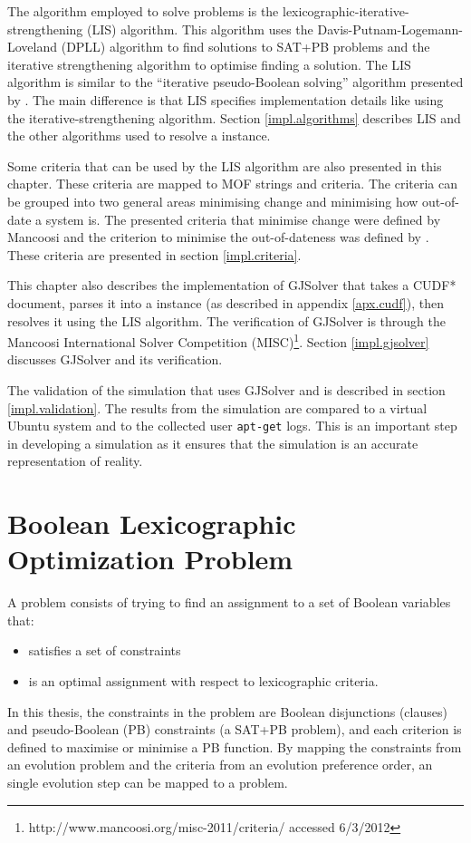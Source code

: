The algorithm employed to solve \modelimpl problems is the lexicographic-iterative-strengthening (LIS) algorithm.
This algorithm uses the Davis-Putnam-Logemann-Loveland (DPLL) \citep{Davis1960, davis1962machine} algorithm to find solutions to SAT+PB problems
and the iterative strengthening \citep{calistri1994iterative, le2010sat4j} algorithm to optimise finding a solution.
The LIS algorithm is similar to the ``iterative pseudo-Boolean solving'' algorithm presented by \cite{marque2011blex}.
The main difference is that LIS specifies implementation details like using the iterative-strengthening algorithm.
Section \ref{impl.algorithms} describes LIS and the other algorithms used to resolve a \modelname instance.

Some criteria that can be used by the LIS algorithm are also presented in this chapter. 
These criteria are mapped to MOF strings and \modelname criteria.
The criteria can be grouped into two general areas minimising change and minimising how out-of-date a system is.
The presented criteria that minimise change were defined by Mancoosi and the criterion to minimise the out-of-dateness was defined by \cite{leBerre2010}.
These criteria are presented in section \ref{impl.criteria}.

This chapter also describes the implementation of GJSolver that takes a CUDF* document, parses it into a \modelname instance (as described in appendix \ref{apx.cudf}),
then resolves it using the LIS algorithm.
The verification of GJSolver is through the Mancoosi International Solver Competition (MISC)\footnote{http://www.mancoosi.org/misc-2011/criteria/ accessed 6/3/2012}.
Section \ref{impl.gjsolver} discusses GJSolver and its verification.

The validation of the simulation that uses GJSolver and \usermodel is described in section \ref{impl.validation}.
The results from the simulation are compared to a virtual Ubuntu system and to the collected user \texttt{apt-get} logs.
This is an important step in developing a simulation as it ensures that the simulation is an accurate representation of reality. 

\section{Boolean Lexicographic Optimization Problem}
\label{impl.blo}
A \modelimpl problem consists of trying to find an assignment to a set of Boolean variables that:
\begin{itemize}
  \item satisfies a set of constraints
  \item is an optimal assignment with respect to lexicographic criteria.
\end{itemize}
In this thesis, the constraints in the \modelimpl problem are Boolean disjunctions (clauses) and pseudo-Boolean (PB) constraints (a SAT+PB problem),
and each criterion is defined to maximise or minimise a PB function.
By mapping the constraints from an evolution problem and the criteria from an evolution preference order,
an single evolution step can be mapped to a \modelimpl problem.

